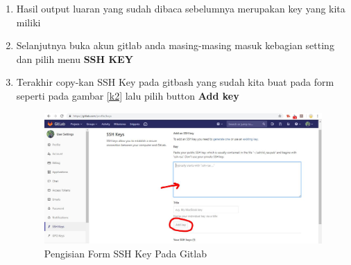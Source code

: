 \begin{enumerate}
\item Hasil output luaran yang sudah dibaca sebelumnya merupakan key yang kita miliki
\item Selanjutnya buka akun gitlab anda masing-masing masuk kebagian setting dan pilih menu \textbf{SSH KEY}
\item Terakhir copy-kan SSH Key pada gitbash yang sudah kita buat pada form seperti pada gambar \ref{k2} lalu pilih button \textbf{Add key}
\subitem
\begin{figure}[!htbp]
\centerline{\includegraphics[width=.75\textwidth]{Figures/gitlab/SettingSSH.JPG}}
\caption{Pengisian Form SSH Key Pada Gitlab}
\label{fig:k2}
\end{figure}
\end{enumerate}

